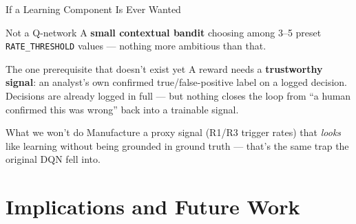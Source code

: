 \documentclass[aspectratio=169, 12pt]{beamer}
\begin{document}
\begin{frame}{If a Learning Component Is Ever Wanted}
  \begin{block}{Not a Q-network}
    A \textbf{small contextual bandit} choosing among 3--5 preset
    \texttt{RATE\_THRESHOLD} values --- nothing more ambitious than that.
  \end{block}
  \vspace{0.3cm}
  \begin{exampleblock}{The one prerequisite that doesn't exist yet}
    A reward needs a \textbf{trustworthy signal}: an analyst's own
    confirmed true/false-positive label on a logged decision. Decisions
    are already logged in full --- but nothing closes the loop from
    ``a human confirmed this was wrong'' back into a trainable signal.
  \end{exampleblock}
  \vspace{0.3cm}
  \begin{alertblock}{What we won't do}
    Manufacture a proxy signal (R1/R3 trigger rates) that \emph{looks}
    like learning without being grounded in ground truth --- that's the
    same trap the original DQN fell into.
  \end{alertblock}
\end{frame}

\section{Implications and Future Work}
\end{document}
